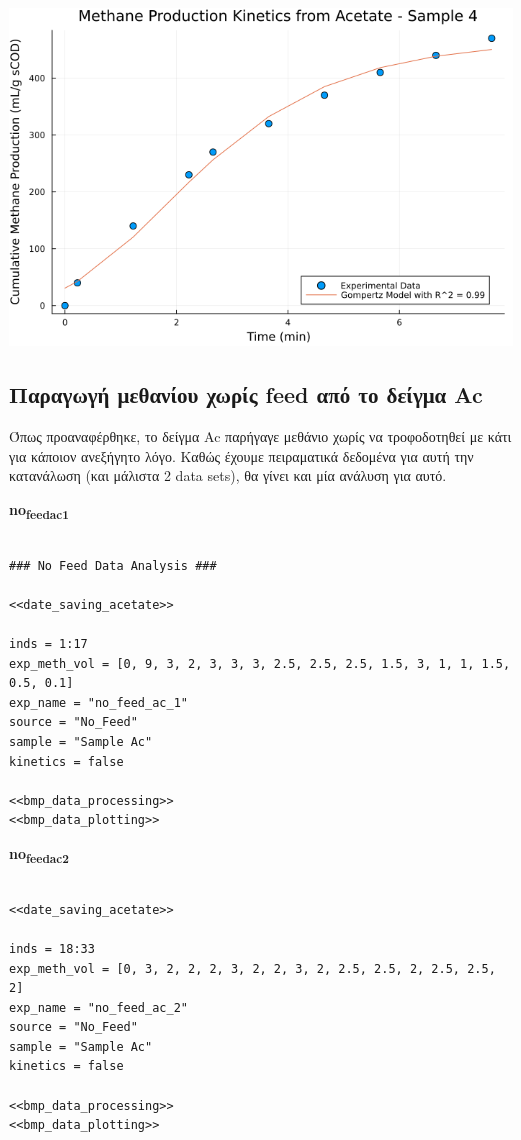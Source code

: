 \documentclass[11pt]{article}
\begin{document}
\begin{center}
\includegraphics[width=.9\linewidth]{../plots/BMPs/Acetate/methane_kinetics_acet_test_4.png}
\end{center}

\subsection{Παραγωγή μεθανίου χωρίς feed από το δείγμα Ac}
\label{sec:org27cf0fc}
Όπως προαναφέρθηκε, το δείγμα Ac παρήγαγε μεθάνιο χωρίς να τροφοδοτηθεί με κάτι για κάποιον ανεξήγητο λόγο. Καθώς έχουμε πειραματικά δεδομένα για αυτή την κατανάλωση (και μάλιστα 2 data sets), θα γίνει και μία ανάλυση για αυτό.

\textbf{no\textsubscript{feed}\textsubscript{ac}\textsubscript{1}}
\begin{verbatim}

### No Feed Data Analysis ###

<<date_saving_acetate>>

inds = 1:17
exp_meth_vol = [0, 9, 3, 2, 3, 3, 3, 2.5, 2.5, 2.5, 1.5, 3, 1, 1, 1.5, 0.5, 0.1]
exp_name = "no_feed_ac_1"
source = "No_Feed"
sample = "Sample Ac"
kinetics = false

<<bmp_data_processing>>
<<bmp_data_plotting>>
\end{verbatim}

\textbf{no\textsubscript{feed}\textsubscript{ac}\textsubscript{2}}
\begin{verbatim}

<<date_saving_acetate>>

inds = 18:33
exp_meth_vol = [0, 3, 2, 2, 2, 3, 2, 2, 3, 2, 2.5, 2.5, 2, 2.5, 2.5, 2]
exp_name = "no_feed_ac_2"
source = "No_Feed"
sample = "Sample Ac"
kinetics = false

<<bmp_data_processing>>
<<bmp_data_plotting>>
\end{verbatim}
\end{document}
